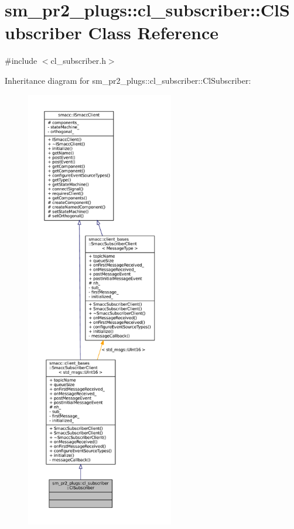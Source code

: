 \hypertarget{classsm__pr2__plugs_1_1cl__subscriber_1_1ClSubscriber}{}\section{sm\+\_\+pr2\+\_\+plugs\+:\+:cl\+\_\+subscriber\+:\+:Cl\+Subscriber Class Reference}
\label{classsm__pr2__plugs_1_1cl__subscriber_1_1ClSubscriber}


{\ttfamily \#include $<$cl\+\_\+subscriber.\+h$>$}



Inheritance diagram for sm\+\_\+pr2\+\_\+plugs\+:\+:cl\+\_\+subscriber\+:\+:Cl\+Subscriber\+:
\nopagebreak
\begin{figure}[H]
\begin{center}
\leavevmode
\includegraphics[height=550pt]{classsm__pr2__plugs_1_1cl__subscriber_1_1ClSubscriber__inherit__graph}
\end{center}
\end{figure}


